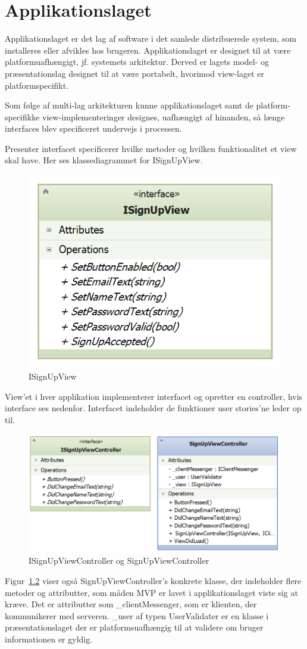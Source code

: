 \chapter{Applikationslaget}
Applikationslaget er det lag af software i det samlede distribuerede system, som installeres eller afvikles hos brugeren. Applikationslaget er designet til at være platformuafhængigt, jf. systemets arkitektur. Derved er lagets model- og præsentationslag designet til at være portabelt, hvorimod view-laget er platformspecifikt. 

Som følge af multi-lag arkitekturen kunne applikationslaget samt de platform-specifikke view-implementeringer
designes, uafhængigt af hinanden, så længe interfaces blev specificeret undervejs i processen. 

Presenter interfacet specificerer hvilke metoder og hvilken funktionalitet et view skal have.
Her ses klassediagrammet for ISignUpView.

\begin{figure}
\centering
\includegraphics[width=0.35\linewidth]{figs/design/application_isignupview}
\caption{ISignUpView}
\label{fig:application_isignupview}
\end{figure}
View'et i hver applikation implementerer interfacet og opretter en controller, hvis interface ses nedenfor.
Interfacet indeholder de funktioner user stories'ne leder op til.
\begin{figure}
\centering
\includegraphics[width=0.7\linewidth]{figs/design/application_signupviewcontrollerandinterface}
\caption{ISignUpViewController og SignUpViewController}
\label{fig:application_isignupviewcontroller}
\end{figure}
Figur~\ref{fig:application_isignupviewcontroller} viser også SignUpViewController's konkrete klasse, der indeholder flere metoder og attributter, som måden MVP er lavet i applikationslaget viste sig at kræve.
Det er attributter som \_clientMessenger, som er klienten, der kommunikerer med serveren. 
\_user af typen UserValidater er en klasse i præsentationslaget der er platformsuafhængig til at validere om bruger informationen er gyldig. 

